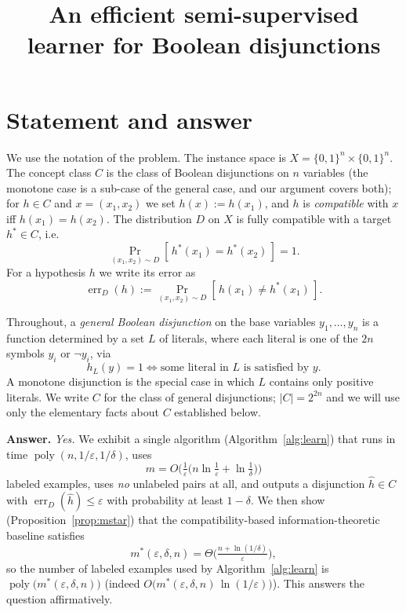 \documentclass{amsart}
\theoremstyle{definition}
\theoremstyle{remark}
\newcommand{\eps}{\varepsilon}
\DeclareMathOperator*{\err}{err}
\DeclareMathOperator{\poly}{poly}
\begin{document}
\title{An efficient semi-supervised learner for Boolean disjunctions}
\maketitle

\section{Statement and answer}

We use the notation of the problem. The instance space is
$X=\{0,1\}^n\times\{0,1\}^n$. The concept class $C$ is the class of Boolean
disjunctions on $n$ variables (the monotone case is a sub-case of the general
case, and our argument covers both); for $h\in C$ and $x=(x_1,x_2)$ we set
$h(x):=h(x_1)$, and $h$ is \emph{compatible} with $x$ iff $h(x_1)=h(x_2)$. The
distribution $D$ on $X$ is fully compatible with a target $h^*\in C$, i.e.
\begin{equation}\label{eq:compat}
\Pr_{(x_1,x_2)\sim D}[\,h^*(x_1)=h^*(x_2)\,]=1 .
\end{equation}
For a hypothesis $h$ we write its error as
\[
\err_D(h):=\Pr_{(x_1,x_2)\sim D}[\,h(x_1)\neq h^*(x_1)\,].
\]

Throughout, a \emph{general Boolean disjunction} on the base variables
$y_1,\dots,y_n$ is a function determined by a set $L$ of literals, where each
literal is one of the $2n$ symbols $y_i$ or $\lnot y_i$, via
\begin{equation}\label{eq:disjdef}
h_L(y)=1 \iff \text{some literal in } L \text{ is satisfied by } y .
\end{equation}
A monotone disjunction is the special case in which $L$ contains only positive
literals. We write $C$ for the class of general disjunctions; $|C|=2^{2n}$ and we
will use only the elementary facts about $C$ established below.

\medskip

\noindent\textbf{Answer.} \emph{Yes.} We exhibit a single algorithm
(Algorithm~\ref{alg:learn}) that runs in time $\poly(n,1/\eps,1/\delta)$, uses
\[
m=O\!\Big(\tfrac1\eps\big(n\ln\tfrac1\eps+\ln\tfrac1\delta\big)\Big)
\]
labeled examples, uses \emph{no} unlabeled pairs at all, and outputs a
disjunction $\hat h\in C$ with $\err_D(\hat h)\le\eps$ with probability at least
$1-\delta$. We then show (Proposition~\ref{prop:mstar}) that the
compatibility-based information-theoretic baseline satisfies
\[
m^*(\eps,\delta,n)=\Theta\!\Big(\tfrac{n+\ln(1/\delta)}{\eps}\Big),
\]
so the number of labeled examples used by Algorithm~\ref{alg:learn} is
$\poly\big(m^*(\eps,\delta,n)\big)$ (indeed $O\big(m^*(\eps,\delta,n)\,\ln(1/\eps)\big)$).
This answers the question affirmatively.
\end{document}
